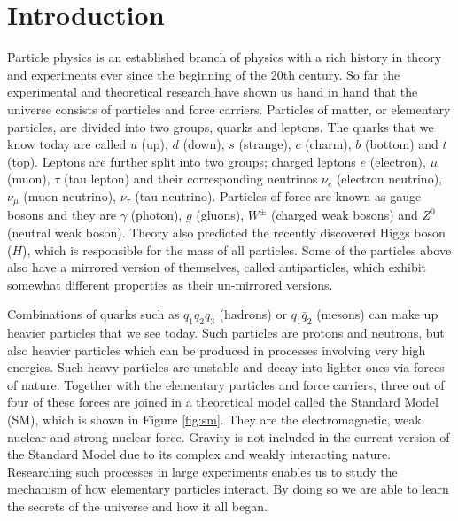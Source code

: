 \chapter{Introduction}

Particle physics is an established branch of physics with a rich history in theory and experiments ever since the beginning of the 20th century. So far the experimental and theoretical research have shown us hand in hand that the universe consists of particles and force carriers. Particles of matter, or elementary particles, are divided into two groups, quarks and leptons. The quarks that we know today are called $u$ (up), $d$ (down), $s$ (strange), $c$ (charm), $b$ (bottom) and $t$ (top). Leptons are  further split into two groups; charged leptons $e$ (electron), $\mu$ (muon), $\tau$ (tau lepton) and their corresponding neutrinos $\nu_e$ (electron neutrino), $\nu_\mu$ (muon neutrino), $\nu_\tau$ (tau neutrino). Particles of force are known as gauge bosons and they are $\gamma$ (photon), $g$ (gluons), $W^\pm$ (charged weak bosons) and $Z^0$ (neutral weak boson). Theory also predicted the recently discovered Higgs boson ($H$), which is responsible for the mass of all particles. Some of the particles above also have a mirrored version of themselves, called antiparticles, which exhibit somewhat different properties as their un-mirrored versions.

Combinations of quarks such as $q_1 q_2 q_3$ (hadrons) or $q_1 \bar{q}_2$ (mesons) can make up heavier particles that we see today. Such particles are protons and neutrons, but also heavier particles which can be produced in processes involving very high energies. Such heavy particles are unstable and decay into lighter ones via forces of nature. Together with the elementary particles and force carriers, three out of four of these forces are joined in a theoretical model called the Standard Model (SM), which is shown in Figure \ref{fig:sm}. They are the electromagnetic, weak nuclear and strong nuclear force. Gravity is not included in the current version of the Standard Model due to its complex and weakly interacting nature. Researching such processes in large experiments enables us to study the mechanism of how elementary particles interact. By doing so we are able to learn the secrets of the universe and how it all began.

